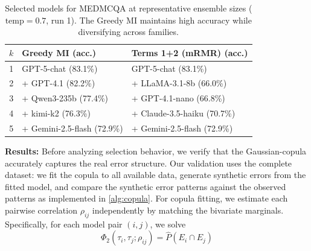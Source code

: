 \documentclass{article}
\theoremstyle{plain}
\theoremstyle{definition}
\theoremstyle{remark}
\begin{document}
\begin{table}[t]
\centering
\caption{Selected models for MEDMCQA at representative ensemble sizes (\(\text{temp}=0.7\), run 1). The Greedy MI maintains high accuracy while diversifying across families.}
\label{tab:medmcqa_selections}%
\small
\setlength{\tabcolsep}{4pt}
\begin{tabularx}{\columnwidth}{cXX}
\toprule
$k$ & \textbf{Greedy MI (acc.)} & \textbf{Terms 1+2 (mRMR) (acc.)} \\
\midrule
1 & GPT-5-chat (83.1\%) & GPT-5-chat (83.1\%) \\
2 & + GPT-4.1 (82.2\%) & + LLaMA-3.1-8b (66.0\%) \\
3 & + Qwen3-235b (77.4\%) & + GPT-4.1-nano (66.8\%) \\
4 & + kimi-k2 (76.3\%) & + Claude-3.5-haiku (70.7\%) \\
5 & + Gemini-2.5-flash (72.9\%) & + Gemini-2.5-flash (72.9\%) \\
\bottomrule
\end{tabularx}
\end{table}
\noindent\textbf{Results:} Before analyzing selection behavior, we verify that the Gaussian-copula accurately captures the real error structure. Our validation uses the complete dataset: we fit the copula to all available data, generate synthetic errors from the fitted model, and compare the synthetic error patterns against the observed patterns as implemented in \cref{alg:copula}. For copula fitting, we estimate each pairwise correlation $\rho_{ij}$ independently by matching the bivariate marginals. Specifically, for each model pair $(i,j)$, we solve
\begin{equation}
\Phi_2(\tau_i, \tau_j; \rho_{ij}) = \hat{P}(E_i \cap E_j)
\end{equation}
\end{document}
